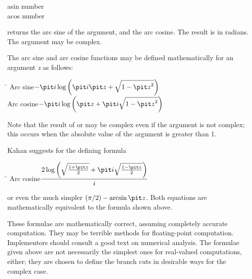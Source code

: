 \begin{defun}[Function]
asin number \\
acos number

 returns the arc sine of the argument, and  the arc cosine.
The result is in radians.  The argument may be complex.

The arc sine and arc cosine functions may be defined mathematically for
an argument {\it z} as follows:
\begin{tabbing}
\hskip 10pc\=\kill
Arc sine\>$ -{\it i} \log \left({\it i}{\it z} + \sqrt{1-{\it z}^2}\right) $ \\[2pt]
Arc cosine\>$ -{\it i} \log \left({\it z} + {\it i}\sqrt{1-{\it z}^2}\right) $
\end{tabbing}
Note that the result of  or  may be
complex even if the argument is not complex; this occurs
when the absolute value of the argument is greater than 1.

\begin{newer}
Kahan \cite{KAHAN-COMPLEX-FNS} suggests for  the
defining formula
\begin{tabbing}
\hskip 10pc\=\kill
Arc cosine\>$  \displaystyle { 2 \log \left( \sqrt{{1+{\it z} \over 2}} + {\it i} \sqrt{{1-{\it z} \over 2}} \right) \over i}$
\end{tabbing}
or even the much simpler $ (\pi/2)-\arcsin {\it z} $.  Both equations are mathematically
equivalent to the formula shown above.
\end{newer}

\beforenoterule
\begin{implementation}
These formulae are mathematically correct, assuming
completely accurate computation.  They may be terrible methods for
floating-point computation.  Implementors should consult a good text on
numerical analysis.  The formulae given above are not necessarily
the simplest ones for real-valued computations, either; they are chosen
to define the branch cuts in desirable ways for the complex case.
\end{implementation}
\afternoterule
\end{defun}

